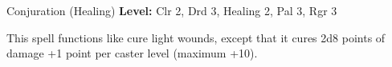 {Conjuration (Healing)}
{
	\textbf{Level:}
	Clr 2, Drd 3, Healing 2, Pal 3, Rgr 3\\
}
{
	This spell functions like cure light wounds, except that it cures 2d8 points of damage +1 point per caster level (maximum +10).

}
